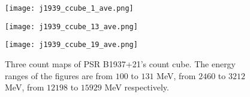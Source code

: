 \documentclass[12pt]{report}
\begin{document}
        \begin{figure}[!htp]
          \begin{minipage}{0.32\textwidth}
            \begin{center} 
              \texttt{[image: j1939\_ccube\_1\_ave.png]}
            \end{center}
          \end{minipage}
          \begin{minipage}{0.32\textwidth}
            \begin{center}
              \texttt{[image: j1939\_ccube\_13\_ave.png]}
            \end{center}
          \end{minipage}
          \begin{minipage}{0.32\textwidth}
            \begin{center}
            \texttt{[image: j1939\_ccube\_19\_ave.png]}
            \end{center}
          \end{minipage}
          \caption{Three count maps of PSR B1937+21's count cube. The energy ranges of the 
            figures are from $100$ to $131$ MeV, from $2460$ to $3212$ MeV, from $12198$ to
            $15929$ MeV respectively.}
          \label{fig: j1939_count_cube_ave}
        \end{figure}
\end{document}
